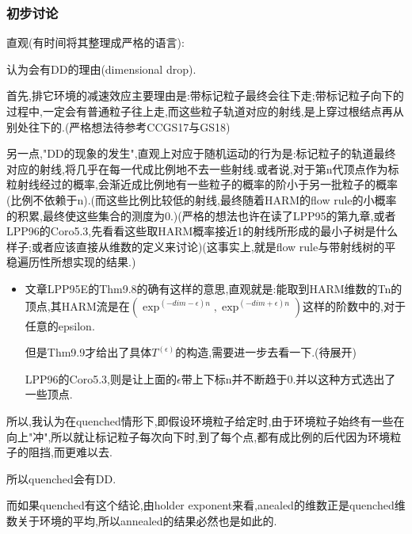 \documentclass[a4paper,oneside]{ctexbook}
\begin{document}
			\qquad 

			\qquad 

			

			

			

		\subsubsection*{初步讨论}

			直观(有时间将其整理成严格的语言):

				\begin{conjec}

					认为会有DD的理由(dimensional drop).

					首先,排它环境的减速效应主要理由是:带标记粒子最终会往下走;带标记粒子向下的过程中,一定会有普通粒子往上走,而这些粒子轨道对应的射线,是上穿过根结点再从别处往下的.(严格想法待参考CCGS17与GS18)

					另一点,"DD的现象的发生",直观上对应于随机运动的行为是:标记粒子的轨道最终对应的射线,将几乎在每一代成比例地不去一些射线.或者说,对于第n代顶点作为标粒射线经过的概率,会渐近成比例地有一些粒子的概率的阶小于另一批粒子的概率(比例不依赖于n).(而这些比例比较低的射线,最终随着HARM的flow rule的小概率的积累,最终使这些集合的测度为0.)(严格的想法也许在读了LPP95的第九章,或者LPP96的Coro5.3,先看看这些取HARM概率接近1的射线所形成的最小子树是什么样子;或者应该直接从维数的定义来讨论)(这事实上,就是flow rule与带射线树的平稳遍历性所想实现的结果.)

						\begin{itemize}
							\item 

							文章LPP95E的Thm9.8的确有这样的意思,直观就是:能取到HARM维数的Tn的顶点,其HARM流是在$(\exp^{(-dim-\epsilon)n},\exp^{(-dim+\epsilon)n})$这样的阶数中的,对于任意的epsilon.

							但是Thm9.9才给出了具体$T^(\epsilon)$的构造,需要进一步去看一下.(待展开)

							LPP96的Coro5.3,则是让上面的$\epsilon$带上下标n并不断趋于0.并以这种方式选出了一些顶点.
						\end{itemize}

					所以,我认为在quenched情形下,即假设环境粒子给定时,由于环境粒子始终有一些在向上"冲",所以就让标记粒子每次向下时,到了每个点,都有成比例的后代因为环境粒子的阻挡,而更难以去.

					所以quenched会有DD.

					而如果quenched有这个结论,由holder exponent来看,anealed的维数正是quenched维数关于环境的平均,所以annealed的结果必然也是如此的.
				\end{conjec}
\end{document}
